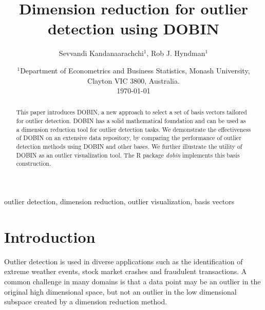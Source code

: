 \documentclass[letter,12pt]{article}
\begin{document}


\title{Dimension reduction for outlier detection using DOBIN}
\author{Sevvandi Kandanaarachchi$^1$, Rob J. Hyndman$^1$}
\date{%
   \scriptsize{ $^1$Department of Econometrics and Business Statistics, Monash University, Clayton VIC 3800, Australia.\\ [2ex]}%
    \today \\
}
\begin{titlingpage}
\maketitle

\begin{abstract}
	This paper introduces DOBIN, a new approach to select a set of basis vectors tailored for outlier detection. DOBIN has a solid mathematical foundation and can be used as a dimension reduction tool for outlier detection tasks. We demonstrate the effectiveness of DOBIN on an extensive data repository, by comparing the performance of outlier detection methods using DOBIN and other bases. We further illustrate the utility of DOBIN as an outlier visualization tool. The R package \textit{dobin} implements this basis construction.
\end{abstract}

\begin{keywords}outlier detection, dimension reduction, outlier visualization, basis vectors
\end{keywords}

\end{titlingpage}

\section{Introduction}

Outlier detection is used in diverse applications such as the identification of extreme weather events, stock market crashes and fraudulent transactions. A common challenge in many domains is that a data point may be an outlier in the original high dimensional space, but not an outlier in the low dimensional subspace created by a dimension reduction method.
\end{document}
